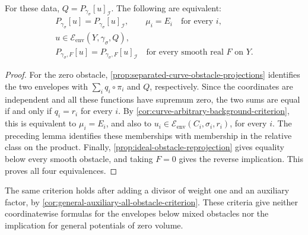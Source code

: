 \begin{proposition}\label{prop:separated-product-all-obstacle-criterion}
For these data, $Q=P_{\gamma_\sigma}[u]_{\mathcal I}$. The following are equivalent:
\[
 \begin{gathered}
 P_{\gamma_\sigma}[u]=P_{\gamma_\sigma}[u]_{\mathcal I},
 \qquad \mu_i=E_i\quad\text{for every }i,\\
 u\in\mathcal E_{\mathrm{env}}(Y,\gamma_\sigma,Q),\\
 P_{\gamma_\sigma,F}[u]=P_{\gamma_\sigma,F}[u]_{\mathcal I}
       \quad\text{for every smooth real }F\text{ on }Y.
 \end{gathered}
\]
\end{proposition}
\begin{proof}
For the zero obstacle, \cref{prop:separated-curve-obstacle-projections} identifies the two envelopes with $\sum_iq_i\circ\pi_i$ and $Q$, respectively. Since the coordinates are independent and all these functions have supremum zero, the two sums are equal if and only if $q_i=r_i$ for every $i$. By \cref{cor:curve-arbitrary-background-criterion}, this is equivalent to $\mu_i=E_i$, and also to $u_i\in\mathcal E_{\mathrm{env}}(C_i,\sigma_i,r_i)$, for every $i$. The preceding lemma identifies these memberships with membership in the relative class on the product. Finally, \cref{prop:ideal-obstacle-reprojection} gives equality below every smooth obstacle, and taking $F=0$ gives the reverse implication. This proves all four equivalences.
\end{proof}

The same criterion holds after adding a divisor of weight one and an auxiliary factor, by \cref{cor:general-auxiliary-all-obstacle-criterion}. These criteria give neither coordinatewise formulas for the envelopes below mixed obstacles nor the implication for general potentials of zero volume.
